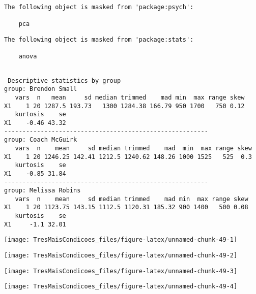 \documentclass[]{article}
\begin{document}
\begin{verbatim}
The following object is masked from 'package:psych':

    pca
\end{verbatim}

\begin{verbatim}
The following object is masked from 'package:stats':

    anova
\end{verbatim}

\begin{verbatim}

 Descriptive statistics by group 
group: Brendon Small
   vars  n   mean     sd median trimmed    mad min  max range skew
X1    1 20 1287.5 193.73   1300 1284.38 166.79 950 1700   750 0.12
   kurtosis    se
X1    -0.46 43.32
-------------------------------------------------------- 
group: Coach McGuirk
   vars  n    mean     sd median trimmed    mad  min  max range skew
X1    1 20 1246.25 142.41 1212.5 1240.62 148.26 1000 1525   525  0.3
   kurtosis    se
X1    -0.85 31.84
-------------------------------------------------------- 
group: Melissa Robins
   vars  n    mean     sd median trimmed    mad min  max range skew
X1    1 20 1123.75 143.15 1112.5 1120.31 185.32 900 1400   500 0.08
   kurtosis    se
X1     -1.1 32.01
\end{verbatim}

\begin{center}\texttt{[image: TresMaisCondicoes\_files/figure-latex/unnamed-chunk-49-1]} \end{center}

\begin{center}\texttt{[image: TresMaisCondicoes\_files/figure-latex/unnamed-chunk-49-2]} \end{center}

\begin{center}\texttt{[image: TresMaisCondicoes\_files/figure-latex/unnamed-chunk-49-3]} \end{center}

\begin{center}\texttt{[image: TresMaisCondicoes\_files/figure-latex/unnamed-chunk-49-4]} \end{center}
\end{document}
